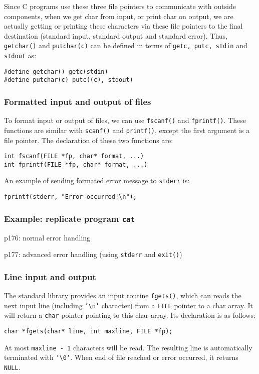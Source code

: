 \documentclass[11pt]{article}
\begin{document}
Since C programs use these three file pointers to communicate with outside components, when we get char from input, or print char on output, we are actually getting or printing these characters via these file pointers to the final destination (standard input, standard output and standard error). Thus, \texttt{getchar()} and \texttt{putchar(c)} can be defined in terms of \texttt{getc, putc, stdin} and \texttt{stdout} as:
\begin{verbatim}
#define getchar() getc(stdin)
#define putchar(c) putc((c), stdout)
\end{verbatim}

\subsubsection{Formatted input and output of files}
\label{sec:org1da1558}
To format input or output of files, we can use \texttt{fscanf()} and \texttt{fprintf()}. These functions are similar with \texttt{scanf()} and \texttt{printf()}, except the first argument is a file pointer. The declaration of these two functions are:
\begin{verbatim}
int fscanf(FILE *fp, char* format, ...)
int fprintf(FILE *fp, char* format, ...)
\end{verbatim}

An example of sending formated error message to \texttt{stderr} is:
\begin{verbatim}
fprintf(stderr, "Error occurred!\n");
\end{verbatim}
\subsubsection{Example: replicate program \texttt{cat}}
\label{sec:orge2a5d93}
p176: normal error handling

p177: advanced error handling (using \texttt{stderr} and \texttt{exit()})
\subsubsection{Line input and output}
\label{sec:orgf079509}
The standard library provides an input routine \texttt{fgets()}, which can reads the next input line (including \texttt{'\textbackslash{}n'} character) from a \texttt{FILE} pointer to a char array. It will return a \texttt{char} pointer pointing to this char array. Its declaration is as follows:
\begin{verbatim}
char *fgets(char* line, int maxline, FILE *fp);
\end{verbatim}
At most \texttt{maxline - 1} characters will be read. The resulting line is automatically terminated with \texttt{'\textbackslash{}0'}. When end of file reached or error occurred, it returns \texttt{NULL}.
\end{document}
